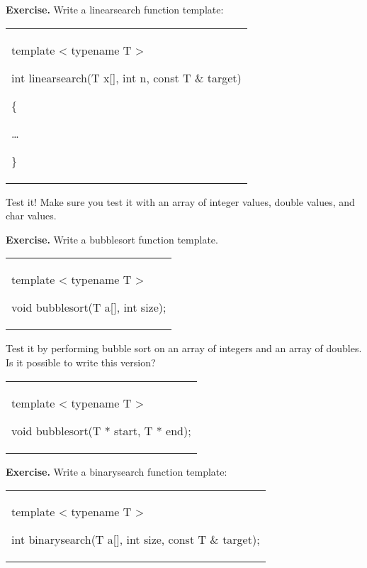 \documentclass[
]{article}
\begin{document}
\textbf{Exercise. }Write a linearsearch function template:

\begin{longtable}[]{@{}
  >{\raggedright\arraybackslash}p{}@{}}
\toprule\noalign{}
 \\
\midrule\noalign{}
\endhead
\bottomrule\noalign{}
\endlastfoot
template \textless{} typename T \textgreater{}

int linearsearch(T x{[}{]}, int n, const T \& target)

\{

\ldots{}

\} \\
\end{longtable}

Test it! Make sure you test it with an array of integer values, double
values, and char values.

\textbf{Exercise.} Write a bubblesort function template.

\begin{longtable}[]{@{}
  >{\raggedright\arraybackslash}p{}@{}}
\toprule\noalign{}
 \\
\midrule\noalign{}
\endhead
\bottomrule\noalign{}
\endlastfoot
template \textless{} typename T \textgreater{}

void bubblesort(T a{[}{]}, int size); \\
\end{longtable}

Test it by performing bubble sort on an array of integers and an array
of doubles. Is it possible to write this version?

\begin{longtable}[]{@{}
  >{\raggedright\arraybackslash}p{}@{}}
\toprule\noalign{}
 \\
\midrule\noalign{}
\endhead
\bottomrule\noalign{}
\endlastfoot
template \textless{} typename T \textgreater{}

void bubblesort(T * start, T * end); \\
\end{longtable}

\textbf{Exercise.} Write a binarysearch function template:

\begin{longtable}[]{@{}
  >{\raggedright\arraybackslash}p{}@{}}
\toprule\noalign{}
 \\
\midrule\noalign{}
\endhead
\bottomrule\noalign{}
\endlastfoot
template \textless{} typename T \textgreater{}

int binarysearch(T a{[}{]}, int size, const T \& target); \\
\end{longtable}
\end{document}
